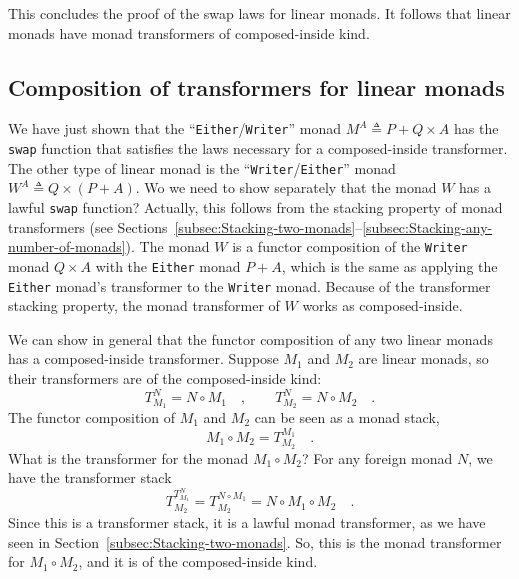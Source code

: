 This concludes the proof of the swap laws for linear monads. It follows
that linear monads have monad transformers of composed-inside kind.

\subsection{Composition of transformers for linear monads}

We have just shown that the ``\lstinline!Either!/\lstinline!Writer!''
monad $M^{A}\triangleq P+Q\times A$ has the \lstinline!swap!
function that satisfies the laws necessary for a composed-inside transformer.
The other type of linear monad is the ``\lstinline!Writer!/\lstinline!Either!''
monad $W^{A}\triangleq Q\times\left(P+A\right)$. Wo we need to show
separately that the monad $W$ has a lawful \lstinline!swap!
function? Actually, this follows from the stacking property of monad
transformers (see Sections~\ref{subsec:Stacking-two-monads}–\ref{subsec:Stacking-any-number-of-monads}).
The monad $W$ is a functor composition of the \lstinline!Writer!
monad $Q\times A$ with the \lstinline!Either!
monad $P+A$, which is the same as applying the \lstinline!Either!
monad's transformer to the \lstinline!Writer!
monad. Because of the transformer stacking property, the monad transformer
of $W$ works as composed-inside.

We can show in general that the functor composition of any two linear
monads has a composed-inside transformer. Suppose $M_{1}$ and $M_{2}$
are linear monads, so their transformers are of the composed-inside
kind:
\[
T_{M_{1}}^{N}=N\circ M_{1}\quad,\quad\quad T_{M_{2}}^{N}=N\circ M_{2}\quad.
\]
The functor composition of $M_{1}$ and $M_{2}$ can be seen as a
monad stack,
\[
M_{1}\circ M_{2}=T_{M_{2}}^{M_{1}}\quad.
\]
What is the transformer for the monad $M_{1}\circ M_{2}$? For any
foreign monad $N$, we have the transformer stack
\[
T_{M_{2}}^{T_{M_{1}}^{N}}=T_{M_{2}}^{N\circ M_{1}}=N\circ M_{1}\circ M_{2}\quad.
\]
Since this is a transformer stack, it is a lawful monad transformer,
as we have seen in Section~\ref{subsec:Stacking-two-monads}. So,
this is the monad transformer for $M_{1}\circ M_{2}$, and it is of
the composed-inside kind.

